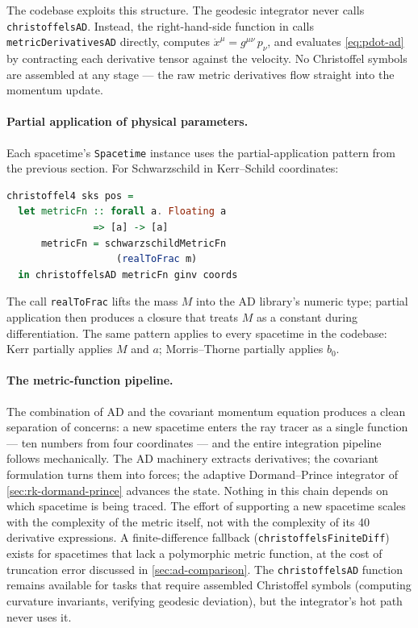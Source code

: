 The codebase exploits this structure.  The geodesic
integrator never calls \texttt{christoffelsAD}.  Instead,
the right-hand-side function in
 calls
\texttt{metricDerivativesAD} directly, computes
$\dot{x}^\mu = g^{\mu\nu}\,p_\nu$, and evaluates
\cref{eq:pdot-ad} by contracting each derivative tensor
against the velocity.
No Christoffel symbols are assembled at any stage --- the raw
metric derivatives flow straight into the momentum update.

\paragraph{Partial application of physical parameters.}

Each spacetime's \texttt{Spacetime} instance uses the
partial-application pattern from the previous section.
For Schwarzschild in Kerr--Schild coordinates:
%
\begin{lstlisting}[language=Haskell]
christoffel4 sks pos =
  let metricFn :: forall a. Floating a
               => [a] -> [a]
      metricFn = schwarzschildMetricFn
                   (realToFrac m)
  in christoffelsAD metricFn ginv coords
\end{lstlisting}
%
The call \texttt{realToFrac} lifts the mass $M$ into the AD
library's numeric type; partial application then produces a
closure that treats $M$ as a constant during differentiation.
The same pattern applies to every spacetime in the codebase:
Kerr partially applies $M$ and $a$; Morris--Thorne partially
applies $b_0$.

\paragraph{The metric-function pipeline.}

The combination of AD and the covariant momentum equation produces
a clean separation of concerns: a new spacetime enters the ray
tracer as a single function --- ten numbers from four
coordinates --- and the entire integration pipeline follows
mechanically.  The AD machinery extracts derivatives; the
covariant formulation turns them into forces; the adaptive
Dormand--Prince integrator of \cref{sec:rk-dormand-prince}
advances the state.  Nothing in this chain depends on which
spacetime is being traced.  The effort of supporting a new spacetime scales
with the complexity of the metric itself, not with the complexity
of its 40 derivative expressions.  A finite-difference fallback
(\texttt{christoffelsFiniteDiff}) exists for spacetimes that lack
a polymorphic metric function, at the cost of truncation error
discussed in \cref{sec:ad-comparison}.  The
\texttt{christoffelsAD} function remains available for tasks that
require assembled Christoffel symbols (computing curvature
invariants, verifying geodesic deviation), but the integrator's
hot path never uses it.
